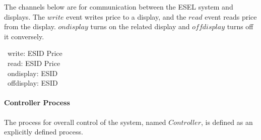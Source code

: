 The channels below are for communication between the ESEL system and displays. The $write$ event writes price to a display, and the $read$ event reads price from the display. $ondisplay$ turns on the related display and $offdisplay$ turns off it conversely.
\begin{circus}
	\circchannel\ write: ESID \cross Price \\
	\circchannel\ read: ESID \cross Price \\
	\circchannel\ ondisplay: ESID \\
	\circchannel\ offdisplay: ESID
\end{circus}


\paragraph{Controller Process}
The process for overall control of the system, named $Controller$, is defined as an explicitly defined process.

